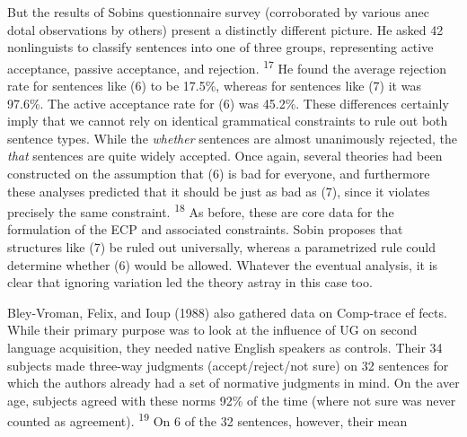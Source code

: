 \begin{styleTextbody}
But the results of Sobin{\textquotesingle}s questionnaire survey (corroborated by various anec\- dotal observations by others) present a distinctly different picture. He asked 42 nonlinguists to classify sentences into one of three groups, representing active acceptance, passive acceptance, and rejection. \textsuperscript{17}\textsuperscript{ }He found the average rejection rate for sentences like (6) to be 17.5\%, whereas for sentences like (7) it was 97.6\%. The active acceptance rate for (6) was 45.2\%. These differences certainly imply that we cannot rely on identical grammatical constraints to rule out both sentence types. While the \textit{whether}\textit{ }sentences are almost unanimously rejected, the \textit{that}\textit{ }sentences are quite widely accepted. Once again, several theories had been constructed on the assumption that (6) is bad for everyone, and furthermore these analyses predicted that it should be just as bad as (7), since it violates precisely the same constraint. \textsuperscript{18}\textsuperscript{ }As before, these are core data for the formulation of the ECP and associated constraints. Sobin proposes that structures like (7) be ruled out universally, whereas a parametrized rule could determine whether (6) would be allowed. Whatever the eventual analysis, it is clear that ignoring variation led the theory astray in this case too.
\end{styleTextbody}


\begin{styleTextbody}
Bley-Vroman, Felix, and Ioup (1988) also gathered data on Comp-trace ef\- fects. While their primary purpose was to look at the influence of UG on second\- language acquisition, they needed native English speakers as controls. Their 34 subjects made three-way judgments (accept/reject/not sure) on 32 sentences for which the authors already had a set of normative judgments in mind. On the aver\- age, subjects agreed with these norms 92\% of the time (where {\textquotedbl}not sure{\textquotedbl} was never counted as agreement). \textsuperscript{19}\textsuperscript{ }On 6 of the 32 sentences, however, their mean
\end{styleTextbody}


